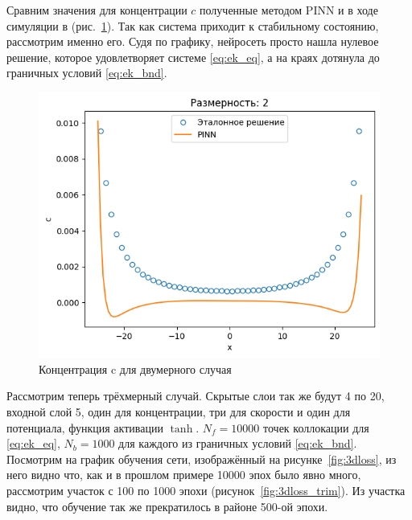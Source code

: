 \documentclass[a4paper,14pt]{extarticle} %
\def\oldcite{} \let\oldcite=\cite
\def\cite{\stepcounter{citesnum}\oldcite}
\begin{document}
Сравним значения для концентрации $c$ полученные методом PINN и в ходе симуляции в \cite{bib:tutor} (рис.~\ref{fig:2dres}). Так как система приходит к стабильному состоянию, рассмотрим именно его. Судя по графику, нейросеть просто нашла нулевое решение, которое удовлетворяет системе \eqref{eq:ek_eq}, а на краях дотянула до граничных условий \eqref{eq:ek_bnd}.

\begin{figure}[H]
    \center
    \includegraphics[scale=0.5]{../plots/ek/2-dim tanh 20x4.png}
    \caption{Концентрация c для двумерного случая}
    \label{fig:2dres}
\end{figure}

Рассмотрим теперь трёхмерный случай. Скрытые слои так же будут 4 по 20, входной слой 5, один для концентрации, три для скорости и один для потенциала, функция активации $\tanh$. $N_f = 10000$ точек коллокации для \eqref{eq:ek_eq}, $N_b=1000$ для каждого из граничных условий \eqref{eq:ek_bnd}. Посмотрим на график обучения сети, изображённый на рисунке~\ref{fig:3dloss}, из него видно что, как и в прошлом примере 10000 эпох было явно много, рассмотрим участок с 100 по 1000 эпохи (рисунок~\ref{fig:3dloss_trim}). Из участка видно, что обучение так же прекратилось в районе 500-ой эпохи.
\end{document}
